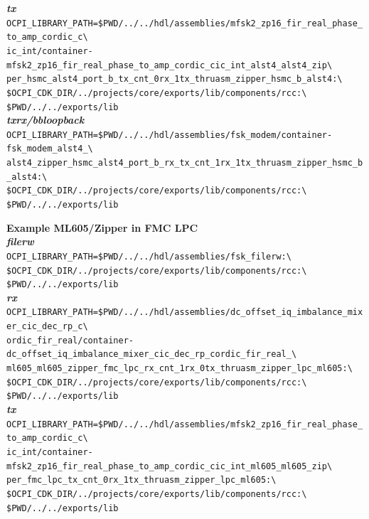 \noindent\textbf{\textit{tx}}\\
\verb|OCPI_LIBRARY_PATH=$PWD/../../hdl/assemblies/mfsk2_zp16_fir_real_phase_to_amp_cordic_c\| \\
\verb|ic_int/container-mfsk2_zp16_fir_real_phase_to_amp_cordic_cic_int_alst4_alst4_zip\| \\ 
\verb|per_hsmc_alst4_port_b_tx_cnt_0rx_1tx_thruasm_zipper_hsmc_b_alst4:\ | \\
\verb|$OCPI_CDK_DIR/../projects/core/exports/lib/components/rcc:\| \\
\verb|$PWD/../../exports/lib| \\

\noindent\textbf{\textit{txrx/bbloopback}}\\
\verb|OCPI_LIBRARY_PATH=$PWD/../../hdl/assemblies/fsk_modem/container-fsk_modem_alst4_\| \\
\verb|alst4_zipper_hsmc_alst4_port_b_rx_tx_cnt_1rx_1tx_thruasm_zipper_hsmc_b_alst4:\| \\
\verb|$OCPI_CDK_DIR/../projects/core/exports/lib/components/rcc:\| \\
\verb|$PWD/../../exports/lib| \\
\par\medskip
\pagebreak

\noindent\textbf{Example ML605/Zipper in FMC LPC}\\
\noindent\textbf{\textit{filerw}}\\
\verb|OCPI_LIBRARY_PATH=$PWD/../../hdl/assemblies/fsk_filerw:\| \\
\verb|$OCPI_CDK_DIR/../projects/core/exports/lib/components/rcc:\| \\
\verb|$PWD/../../exports/lib| \\

\noindent\textbf{\textit{rx}}\\
\verb|OCPI_LIBRARY_PATH=$PWD/../../hdl/assemblies/dc_offset_iq_imbalance_mixer_cic_dec_rp_c\| \\
\verb|ordic_fir_real/container-dc_offset_iq_imbalance_mixer_cic_dec_rp_cordic_fir_real_\| \\
\verb|ml605_ml605_zipper_fmc_lpc_rx_cnt_1rx_0tx_thruasm_zipper_lpc_ml605:\| \\
\verb|$OCPI_CDK_DIR/../projects/core/exports/lib/components/rcc:\| \\
\verb|$PWD/../../exports/lib| \\

\noindent\textbf{\textit{tx}}\\
\verb|OCPI_LIBRARY_PATH=$PWD/../../hdl/assemblies/mfsk2_zp16_fir_real_phase_to_amp_cordic_c\| \\
\verb|ic_int/container-mfsk2_zp16_fir_real_phase_to_amp_cordic_cic_int_ml605_ml605_zip\| \\
\verb|per_fmc_lpc_tx_cnt_0rx_1tx_thruasm_zipper_lpc_ml605:\| \\
\verb|$OCPI_CDK_DIR/../projects/core/exports/lib/components/rcc:\| \\
\verb|$PWD/../../exports/lib| \\

